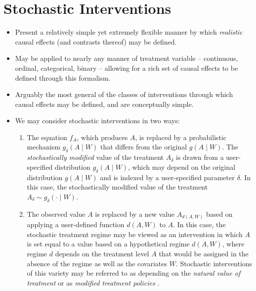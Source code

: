 \documentclass[
  12pt, krantz2,
]{book}
\theoremstyle{definition}
\theoremstyle{definition}
\theoremstyle{definition}
\newcommand{\1}{\mathbbm{1}}
\begin{document}
\hypertarget{stochastic-interventions}{%
\section{Stochastic Interventions}\label{stochastic-interventions}}

\begin{itemize}
\item
  Present a relatively simple yet extremely flexible manner by which \emph{realistic}
  causal effects (and contrasts thereof) may be defined.
\item
  May be applied to nearly any manner of treatment variable -- continuous,
  ordinal, categorical, binary -- allowing for a rich set of causal effects to
  be defined through this formalism.
\item
  Arguably the most general of the classes of interventions through which causal
  effects may be defined, and are conceptually simple.
\item
  We may consider stochastic interventions in two ways:

  \begin{enumerate}
  \def\labelenumi{\arabic{enumi}.}
  \item
    The equation \(f_A\), which produces \(A\), is replaced by a probabilistic
    mechanism \(g_{\delta}(A \mid W)\) that differs from the original \(g(A \mid W)\). The \emph{stochastically modified} value of the treatment \(A_{\delta}\) is
    drawn from a user-specified distribution \(g_\delta(A \mid W)\), which may
    depend on the original distribution \(g(A \mid W)\) and is indexed by a
    user-specified parameter \(\delta\). In this case, the stochastically
    modified value of the treatment \(A_{\delta} \sim g_{\delta}(\cdot \mid W)\).
  \item
    The observed value \(A\) is replaced by a new value \(A_{d(A,W)}\) based on
    applying a user-defined function \(d(A,W)\) to \(A\). In this case, the
    stochastic treatment regime may be viewed as an intervention in which \(A\)
    is set equal to a value based on a hypothetical regime \(d(A, W)\), where
    regime \(d\) depends on the treatment level \(A\) that would be assigned in the
    absence of the regime as well as the covariates \(W\). Stochastic
    interventions of this variety may be referred to as depending on the
    \emph{natural value of treatment} or as \emph{modified treatment policies}
    \citep{haneuse2013estimation, young2014identification}.
  \end{enumerate}
\end{itemize}
\end{document}
